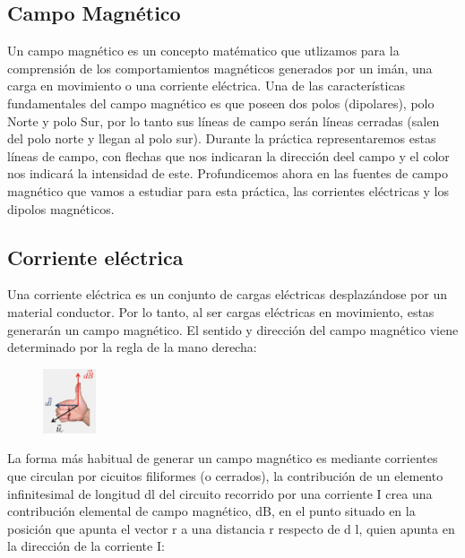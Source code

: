 \documentclass[11pt]{article}
\begin{document}
    \subsection{Campo Magnético}
        \noindent Un campo magnético es un concepto matématico que utlizamos para la comprensión de los comportamientos magnéticos generados por un imán, una carga en movimiento o una corriente eléctrica. Una de las características fundamentales del campo magnético es que poseen dos polos (dipolares), polo Norte y polo Sur, por lo tanto sus líneas de campo serán líneas cerradas (salen del polo norte y llegan al polo sur). Durante la práctica representaremos estas líneas de campo, con flechas que nos indicaran la dirección deel campo y el color nos indicará la intensidad de este.
        \vspace{5mm}
        \newline Profundicemos ahora en las fuentes de campo magnético que vamos a estudiar para esta práctica, las corrientes eléctricas y los dipolos magnéticos.
        \vspace{-0.2cm}        
        \subsection{Corriente eléctrica}
        Una corriente eléctrica es un conjunto de cargas eléctricas desplazándose por un material conductor. Por lo tanto, al ser cargas eléctricas en movimiento, estas generarán un campo magnético. El sentido y dirección del campo magnético viene determinado por la regla de la mano derecha: 
        
        \begin{figure}
            \vspace{-0.44cm}
            \centering
            \includegraphics[width=0.14\textwidth]{Captura.PNG}
        \end{figure}

        \vspace{0.4cm}La forma más habitual de generar un campo magnético es mediante corrientes que circulan por cicuitos filiformes (o cerrados), la contribución de un elemento infinitesimal de longitud dl del circuito recorrido por una corriente I crea una contribución elemental de campo magnético, dB, en el punto situado en la posición que apunta el vector r a una distancia r respecto de d l, quien apunta en la dirección de la corriente I:
\end{document}
